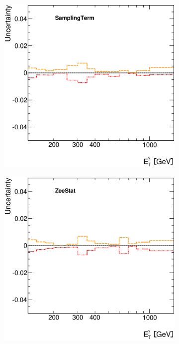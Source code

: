 \documentclass[12pt, twoside]{article}
\numberwithin{equation}{section}
\numberwithin{figure}{section}
\newenvironment{changemargin}[2]{%
\begin{list}{}{%
\setlength{\topsep}{0pt}%
\setlength{\leftmargin}{#1}%
\setlength{\rightmargin}{#2}%
\setlength{\listparindent}{\parindent}%
\setlength{\itemindent}{\parindent}%
\setlength{\parsep}{\parskip}%
}%
\item[]}{\end{list}}
\begin{document}
\begin{figure}
\begin{changemargin}{-1.0cm}{-0.75cm}
\begin{changemargin}{-0.75cm}{-1.0cm}
        \begin{subfigure}[b]{0.27\textwidth}
            \includegraphics[width=\textwidth]{./images/PhotonSystematics/PhotonSystematic-24.eps}
        \end{subfigure}
        \begin{subfigure}[b]{0.27\textwidth}
            \includegraphics[width=\textwidth]{./images/PhotonSystematics/PhotonSystematic-25.eps}

\end{subfigure}
\end{changemargin}
\end{changemargin}
\end{figure}
\end{document}
